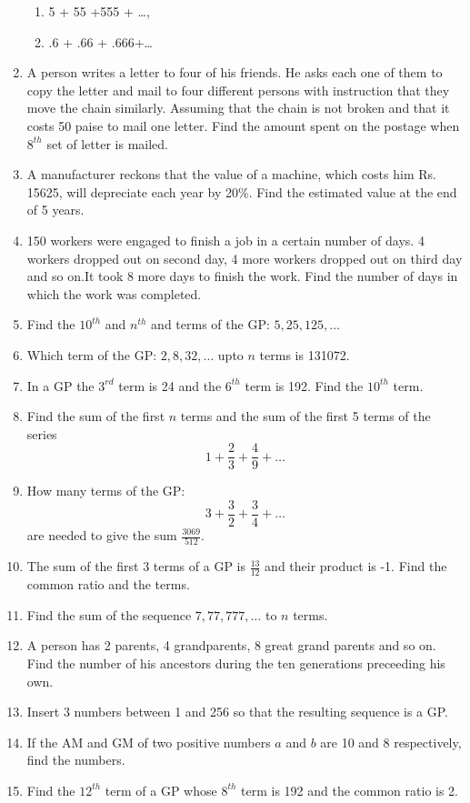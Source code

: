 \begin{enumerate}[label=\thesubsection.\arabic*.,ref=\thesubsection.\theenumi]
\begin{enumerate}
\item 5 + 55 +555 + \dots, 
\item .6 + .66 + .666+\dots 
\end{enumerate}
\item A person writes a letter to four of his friends. He asks each one of them to copy
the letter and mail to four different persons with instruction that they move the
chain similarly. Assuming that the chain is not broken and that it costs 50 paise to
mail one letter. Find the amount spent on the postage when $8^{th}$ set of letter is
mailed. 
\item A manufacturer reckons that the value of a machine,  which costs him Rs. 15625,  will depreciate each year by 20\%. Find the estimated value at the end of 5 years. 
\item 150 workers were engaged to finish a job in a certain number of days. 4 workers dropped out on second day,  4 more workers dropped out on third day and so on.It took 8 more days to finish the work. Find the number of days in which the work was completed.
	\item Find the $10^{th}$ and $n^{th}$ and  terms of the GP: $5, 25, 125, \dots$
	\item Which term of the GP: $2, 8, 32, \dots $ upto $n$ terms is 131072.
	\item In a GP the $3^{rd}$ term is 24 and the $6^{th}$ term is 192.  Find the $10^{th}$ term.
	\item Find the sum of the first $n$ terms and the sum of the first 5 terms of the series 
		$$ 1 + \frac{2}{3}+\frac{4}{9}+\dots$$
	\item How many terms of the GP: 
		$$ 3 + \frac{3}{2}+\frac{3}{4}+\dots$$
		are needed to give the sum $\frac{3069}{512}$.
	\item The sum of the first 3 terms of a GP is 
$\frac{13}{12}$ and their product is -1.  Find the common ratio and the terms.
\item Find the sum of the sequence $7, 77, 777, \dots$ to $n$ terms.
\item A person has 2 parents, 4 grandparents, 8 great grand parents and so on.  Find the number of his ancestors during the ten generations preceeding his own.
\item Insert 3 numbers between 1 and 256 so that the resulting sequence is a GP.
\item If the AM and GM of two positive numbers $a$ and $b$ are 10 and 8 respectively, find the numbers.
\item Find the $12^{th}$ term of a GP  whose $8^{th}$ term is 192 and the common ratio is 2.

\end{enumerate}
